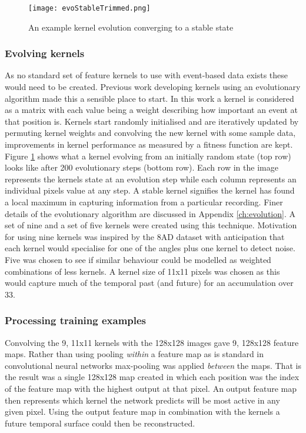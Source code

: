\begin{figure}[h]
    \centering
    \texttt{[image: evoStableTrimmed.png]}
    \caption{An example kernel evolution converging to a stable state}
    \label{fig:evoStable}
\end{figure}

\subsubsection{Evolving kernels}
As no standard set of feature kernels to use with event-based data exists these would need to be created.
Previous work developing kernels using an evolutionary algorithm made this a sensible place to start.
In this work a kernel is considered as a matrix with each value being a weight describing how important an event at that position is.
Kernels start randomly initialised and are iteratively updated by permuting kernel weights and convolving the new kernel with some sample data, improvements in kernel performance as measured by a fitness function are kept.
Figure \ref{fig:evoStable} shows what a kernel evolving from an initially random state (top row) looks like after 200 evolutionary steps (bottom row).
Each row in the image represents the kernels state at an evolution step while each column represents an individual pixels value at any step. 
A stable kernel signifies the kernel has found a local maximum in capturing information from a particular recording.
Finer details of the evolutionary algorithm are discussed in Appendix \ref{ch:evolution}.
A set of nine and a set of five kernels were created using this technique.
Motivation for using nine kernels was inspired by the 8AD dataset with anticipation that each kernel would specialise for one of the angles plus one kernel to detect noise.
Five was chosen to see if similar behaviour could be modelled as weighted combinations of less kernels.
A kernel size of 11x11 pixels was chosen as this would capture much of the temporal past (and future) for an accumulation over 33\ms.



\subsubsection{Processing training examples}
Convolving the 9, 11x11 kernels with the 128x128 images gave 9, 128x128 feature maps.
Rather than using pooling \textit{within} a feature map as is standard in convolutional neural networks max-pooling was applied \textit{between} the maps. 
That is the result was a single 128x128 map created in which each position was the index of the feature map with the highest output at that pixel.
An output feature map then represents which kernel the network predicts will be most active in any given pixel.
Using the output feature map in combination with the kernels a future temporal surface could then be reconstructed. 


